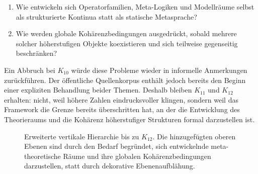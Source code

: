 \begin{enumerate}
\item Wie entwickeln sich Operatorfamilien, Meta-Logiken und Modellräume selbst als strukturierte
      Kontinua statt als statische Metasprache?
\item Wie werden globale Kohärenzbedingungen ausgedrückt, sobald mehrere solcher höherstufigen Objekte koexistieren
      und sich teilweise gegenseitig beschränken?
\end{enumerate}

Ein Abbruch bei \(K_{10}\) würde diese Probleme wieder in informelle Anmerkungen zurückführen. Der
öffentliche Quellenkorpus enthält jedoch bereits den Beginn einer expliziten Behandlung beider Themen. Deshalb
bleiben \(K_{11}\) und \(K_{12}\) erhalten: nicht, weil höhere Zahlen eindrucksvoller klingen, sondern
weil das Framework die Grenze bereits überschritten hat, an der die Entwicklung des Theorieraums und die
Kohärenz höherstufiger Strukturen formal darzustellen ist.

\begin{figure}[htbp]
\centering

\caption{Erweiterte vertikale Hierarchie bis zu \(K_{12}\). Die hinzugefügten oberen Ebenen sind durch den
Bedarf begründet, sich entwickelnde meta-theoretische Räume und ihre globalen Kohärenzbedingungen darzustellen,
statt durch dekorative Ebenenaufblähung.}
\label{fig:oc13-levels-k12}
\end{figure}

